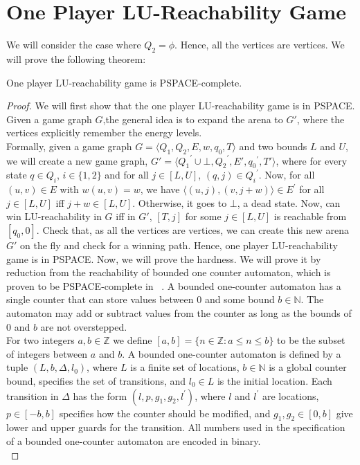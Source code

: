 \section{One Player LU-Reachability Game}
We will consider the case where $Q_2= \phi$. Hence, all the vertices are  vertices. We will prove the following theorem:\\
\begin{theorem}
\label{pspace-complete}
One player LU-reachability game is PSPACE-complete.
\end{theorem}
\begin{proof}
We will first show that the one player LU-reachability game is in PSPACE. Given a game graph $G$,the general idea is to expand the arena to $G'$, where the vertices explicitly remember the energy levels.\\
Formally, given a game graph $G=\langle Q_1, Q_2, E, w, q_0, T \rangle$ and two bounds $L$ and $U$, we will create a new game graph, $G'= \langle {Q_1}^{\prime} \cup \bot,{Q_2}^{\prime},E', {q_0}^{\prime}, T'\rangle$, where for every state $q \in Q_i$, $i \in \{1,2\}$ and for all $j \in [L,U]$,  $(q,j) \in {Q_i}^{\prime}$. Now, for all $(u,v) \in E$ with $w(u,v)=w$, we have $\langle (u,j),(v,j+w)\rangle \in E^{\prime}$ for all $j \in [L,U]$ iff $j+w \in [L,U]$. Otherwise, it goes to  $\bot$, a dead state. Now,  can win LU-reachability in $G$ iff in $G'$, $[T,j]$ for some $j \in [L,U]$ is reachable from $[q_0,0]$. Check that, as all the vertices are  vertices, we can create this new arena $G'$ on the fly and check for a winning path. Hence, one player LU-reachability game is in PSPACE.
\vskip 1cm
Now, we will prove the hardness. We will prove it by reduction from the reachability of bounded one counter automaton, which is proven to be PSPACE-complete in ~\cite{FearnleyJ13}.
\vskip 0.5cm
A bounded one-counter automaton has a single counter that can store values between $0$ and some bound $b \in \mathbb{N}$. The automaton may add or subtract values from the counter as long as the bounds of $0$ and $b$ are not overstepped.\\
For two integers $a, b \in \mathbb{Z}$ we define $[a, b] = \{n \in \mathbb{Z} : a \leq n \leq b\}$ to be the subset of integers between $a$ and $b$. A bounded one-counter automaton is defined by a tuple $(L, b,\Delta ,l_0)$, where $L$ is a finite set of locations, $b \in \mathbb{N}$ is a global counter bound,  specifies the set of transitions, and $l_0 \in L$ is the initial location. Each transition in $\Delta$ has the form
$(l, p, g_1, g_2,l^{\prime})$, where $l$ and $l^{\prime}$ are locations, $p \in [-b,b]$ specifies how the counter should be modified, and $g_1, g_2 \in [0,b]$ give lower and upper guards for the transition. All numbers used in the specification of a bounded one-counter automaton are encoded in binary.\\

\end{proof}
